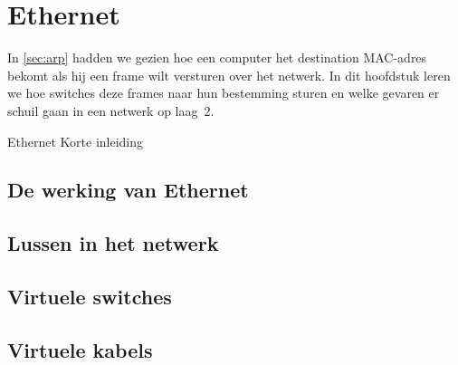 \section{Ethernet}
\label{sec:ethernet}

In \vref{sec:arp} hadden we gezien hoe een computer het destination MAC-adres bekomt als hij een frame wilt versturen over het netwerk.
In dit hoofdstuk leren we hoe switches deze frames naar hun bestemming sturen en welke gevaren er schuil gaan in een netwerk op laag~2.

\begin{frame}{Ethernet}
    Korte inleiding
\end{frame}

\subsection{De werking van Ethernet}

\begin{frame}
\end{frame}

\subsection{Lussen in het netwerk}

\begin{frame}
\end{frame}

\subsection{Virtuele switches}

\begin{frame}
\end{frame}

\subsection{Virtuele kabels}

\begin{frame}
\end{frame}
